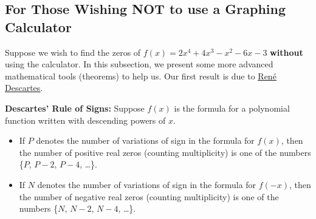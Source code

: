 \documentclass{ximera}
\begin{document}
\subsection{For Those Wishing NOT to use a Graphing Calculator}

Suppose we wish to find the zeros of $f(x) = 2x^4+4x^3-x^2-6x-3$ \textbf{without} using the calculator.  In this subsection, we present some more advanced mathematical tools (theorems) to help us.  Our first result is due to \href{http://en.wikipedia.org/wiki/Descartes}{\underline{Ren\'{e} Descartes}}.

\smallskip

\colorbox{ResultColor}{\bbm

\begin{theorem} \label{DRS}  \textbf{Descartes' Rule of Signs:}  Suppose $f(x)$ is the formula for a polynomial function written with descending powers of $x$.

\begin{itemize}

\item If $P$ denotes the number of variations of sign in the formula for $f(x)$, then the number of positive real zeros (counting multiplicity) is one of the numbers \{$P$, $P-2$, $P-4$, \ldots \}.

\item If $N$ denotes the number of variations of sign in the formula for $f(-x)$, then the number of negative real zeros (counting multiplicity) is one of the numbers \{$N$, $N-2$, $N-4$, \dots\}.

\end{itemize}

\end{theorem}
\ebm}

\smallskip
\end{document}

